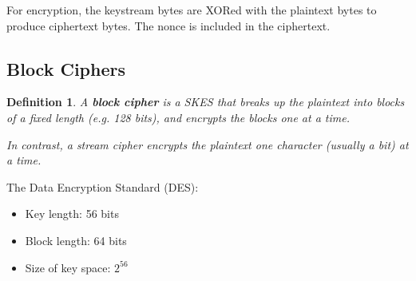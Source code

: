 \documentclass[12pt,titlepage]{article}
\newtheorem{protodefinition}[prototheorem]{Definition}
\newenvironment{definition}
{\colorlet{shadecolor}{cyan!15}\begin{shaded}\begin{protodefinition}\normalfont}{\end{protodefinition}\end{shaded}}
\begin{document}
\newpage
{}

For encryption, the keystream bytes are XORed with the plaintext bytes to produce ciphertext bytes. The nonce is included in the ciphertext.

\subsection{Block Ciphers}
\begin{definition}
	A \textbf{block cipher} is a SKES that breaks up the plaintext into blocks of a fixed length (e.g. 128 bits), and encrypts the blocks one at a time.
	
	In contrast, a stream cipher encrypts the plaintext one character (usually a bit) at a time.
\end{definition}

The Data Encryption Standard (DES): \begin{itemize}
\item Key length: 56 bits 
\item Block length: 64 bits
\item Size of key space: $2^{56}$
\end{itemize}
\end{document}
